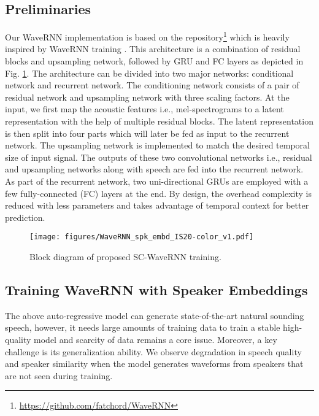 \documentclass[a4paper]{article}
\begin{document}
\subsection{Preliminaries}
Our WaveRNN implementation is based on the repository\footnote{\url{https://github.com/fatchord/WaveRNN}} which is heavily inspired by WaveRNN training \cite{kalchbrenner2018efficient}.  This architecture is a combination of residual blocks and upsampling network, followed by GRU and FC layers as depicted in Fig. \ref{wavernn}. The architecture can be divided into two major networks: conditional network and recurrent network. The conditioning network consists of a pair of residual network and upsampling network with three scaling factors. At the input, we first map the acoustic features i.e., mel-spectrograms to a latent representation with the help of multiple residual blocks. The latent representation is then split into four parts which will later be fed as input to the recurrent network. The upsampling network is implemented to match the desired temporal size of input signal. The outputs of these two convolutional networks i.e., residual and upsampling networks along with speech are fed into the recurrent network. As part of the recurrent network, two uni-directional GRUs are employed with a few fully-connected (FC) layers at the end. By design, the overhead complexity is reduced  with less parameters and takes advantage of temporal context for better prediction.
\vspace{-2mm}


\begin{figure}[h!]
  \begin{center}
  \vspace{-2mm}
    \texttt{[image: figures/WaveRNN\_spk\_embd\_IS20-color\_v1.pdf]}
  \end{center}
  \vspace{-8mm}
  \caption{\small Block diagram of proposed SC-WaveRNN training.}
  \vspace{-7mm}
  \label{wavernn}
\end{figure}
\subsection{Training WaveRNN with Speaker Embeddings}

The above auto-regressive model can generate state-of-the-art natural sounding speech, however, it needs large amounts of training data to train a stable high-quality model and scarcity of data remains a core issue. Moreover, a key challenge is its generalization ability. We observe degradation in speech quality and speaker similarity when the model generates waveforms from speakers that are not seen during training.
\end{document}

